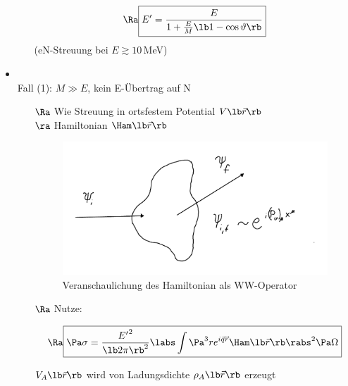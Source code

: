 \begin{itemize}
\begin{enumerate}
\begin{align}
\begin{split}
\Ra \boxed{E^\prime = \frac{E}{1 + \frac{E}{M}\lb  1- \cos \vartheta\rb }}
\end{split}
\end{align}
(eN-Streuung bei $E \gtrsim 10$\,MeV)
\end{enumerate}
\item {}\\
Fall (1): $M \gg E$, \glqq kein\grqq{} E-Übertrag auf N
\begin{itemize}
\item[$\Ra$] Wie Streuung in ortsfestem Potential $V\lb \vec{r}\rb $ \\$\ra$ Hamiltonian $\Ham\lb \vec{r}\rb $
\begin{figure}[!ht]
\centering
\includegraphics[width=.6\textwidth]{imgs/ep5-fig-6-2.pdf}
\caption{Veranschaulichung des Hamiltonian als WW-Operator\label{fig:6.2}}
\end{figure}
\item[$\Ra$] Nutze: 
\begin{align}
\Ra \boxed{ \Pa \sigma = \frac{{E^\prime}^2}{\lb  2\pi\rb ^2} \labs \int \Pa^3 r e^{i \vec{q}\vec{r}} \Ham\lb \vec{r}\rb  \rabs^2 \Pa \Omega }
\end{align}
$V_A\lb \vec{r}\rb $ wird von Ladungsdichte $\rho_A\lb \vec{r}\rb $ erzeugt\\

\end{itemize}
\end{itemize}
